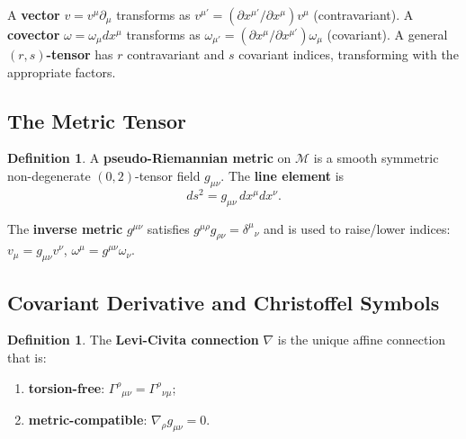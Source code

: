 \documentclass[12pt,a4paper]{article}
\theoremstyle{plain}
\theoremstyle{definition}
\newtheorem{definition}[theorem]{Definition}
\theoremstyle{remark}
\begin{document}
A \textbf{vector} $v = v^\mu\partial_\mu$ transforms as $v^{\mu'} = (\partial x^{\mu'}/\partial x^\mu)v^\mu$ (contravariant). A \textbf{covector} $\omega = \omega_\mu dx^\mu$ transforms as $\omega_{\mu'} = (\partial x^\mu/\partial x^{\mu'})\omega_\mu$ (covariant). A general \textbf{$(r,s)$-tensor} has $r$ contravariant and $s$ covariant indices, transforming with the appropriate factors.

\subsection{The Metric Tensor}

\begin{definition}
A \textbf{pseudo-Riemannian metric} on $\mathcal{M}$ is a smooth symmetric non-degenerate $(0,2)$-tensor field $g_{\mu\nu}$. The \textbf{line element} is
\[
  ds^2 = g_{\mu\nu}\,dx^\mu dx^\nu.
\]
\end{definition}

The \textbf{inverse metric} $g^{\mu\nu}$ satisfies $g^{\mu\rho}g_{\rho\nu} = \delta^\mu{}_\nu$ and is used to raise/lower indices: $v_\mu = g_{\mu\nu}v^\nu$, $\omega^\mu = g^{\mu\nu}\omega_\nu$.

\subsection{Covariant Derivative and Christoffel Symbols}

\begin{definition}
The \textbf{Levi-Civita connection} $\nabla$ is the unique affine connection that is:
\begin{enumerate}[label=(\roman*)]
  \item \textbf{torsion-free}: $\Gamma^\rho{}_{\mu\nu} = \Gamma^\rho{}_{\nu\mu}$;
  \item \textbf{metric-compatible}: $\nabla_\rho g_{\mu\nu} = 0$.
\end{enumerate}
\end{definition}
\end{document}
